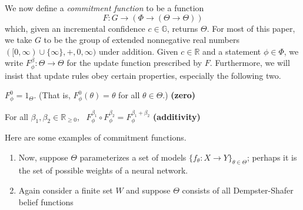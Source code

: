 \documentclass{article}
\begin{document}
We now define a \emph{commitment function} to be a function
\[
    F: G \to ( \Phi \to (\Theta \to \Theta))
\]
which, given an incremental confidence $c \in \mathbb G$, returns $\Theta$.
For most of this paper, we take $G$ to be the group of extended nonnegative real numbers $([0, \infty) \cup \{\infty\}, +, 0, \infty)$ under addition.
Given $c \in \mathbb R$ and a statement $\phi \in \Phi$, we write
$F^\beta_\phi : \Theta \to \Theta$
for the update function prescribed by $F$.
Furthermore, we will insist that update rules obey certain properties, especially the following two.
\begin{URaxioms}
    \item  $F^{0}_\phi  = 1_{\Theta}$.
        (That is, $F^{0}_\phi(\theta) = \theta$ for all $\theta \in \Theta$.)
        \hfill \textbf{(zero)} \label{ax:zero}
    \item For all $\beta_1, \beta_2 \in \mathbb R_{\ge 0}$,~
        $F^{\beta_1}_\phi \circ F^{\beta_2}_\phi = F^{\beta_1 + \beta_2}_\phi$
        \hfill \textbf{(additivity)} \label{ax:additivity}
\end{URaxioms}

Here are some examples of commitment functions.
\begin{enumerate}
\item
Now, suppose $\Theta$ parameterizes a set of models $\{ f_\theta : X \to Y \}_{\theta \in \Theta}$; perhaps it is the set of possible weights of a neural network.


\item
Again consider a finite set $W$ and suppose $\Theta$ consists of all Dempster-Shafer belief functions
\end{enumerate}
\end{document}
